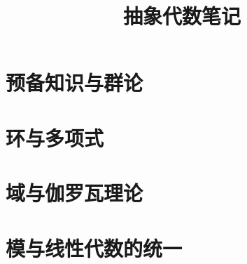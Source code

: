 \documentclass[UTF8,12pt,a4paper,fontset=fandol]{ctexbook}
\title{抽象代数笔记}
\author{}
\date{}
\begin{document}
\frontmatter %


\maketitle
\tableofcontents


\mainmatter

\part{预备知识与群论}










\part{环与多项式}





\part{域与伽罗瓦理论}







\part{模与线性代数的统一}



\backmatter


\end{document}
